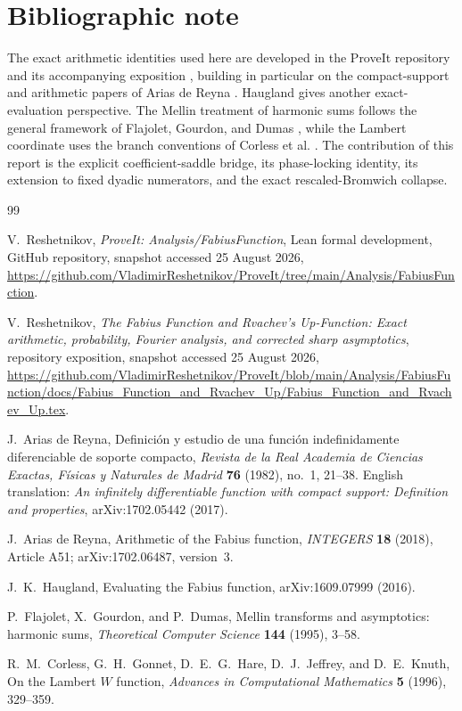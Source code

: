 \documentclass[11pt,oneside]{article}
\theoremstyle{definition}
\theoremstyle{remark}
\begin{document}
\section{Bibliographic note}

The exact arithmetic identities used here are developed in the ProveIt repository and its accompanying exposition \cite{proveit,masterdoc}, building in particular on the compact-support and arithmetic papers of Arias de Reyna \cite{arias1982,arias2018}.  Haugland \cite{haugland2016} gives another exact-evaluation perspective.  The Mellin treatment of harmonic sums follows the general framework of Flajolet, Gourdon, and Dumas \cite{flajolet1995}, while the Lambert coordinate uses the branch conventions of Corless et al. \cite{corless1996}.  The contribution of this report is the explicit coefficient-saddle bridge, its phase-locking identity, its extension to fixed dyadic numerators, and the exact rescaled-Bromwich collapse.

\begin{thebibliography}{99}

V.~Reshetnikov,
\newblock \emph{ProveIt: Analysis/FabiusFunction}, Lean formal development,
\newblock GitHub repository, snapshot accessed 25 August 2026,
\newblock \url{https://github.com/VladimirReshetnikov/ProveIt/tree/main/Analysis/FabiusFunction}.

V.~Reshetnikov,
\newblock \emph{The Fabius Function and Rvachev's Up-Function: Exact arithmetic, probability, Fourier analysis, and corrected sharp asymptotics},
\newblock repository exposition, snapshot accessed 25 August 2026,
\newblock \url{https://github.com/VladimirReshetnikov/ProveIt/blob/main/Analysis/FabiusFunction/docs/Fabius_Function_and_Rvachev_Up/Fabius_Function_and_Rvachev_Up.tex}.

J.~Arias de Reyna,
\newblock Definici\'on y estudio de una funci\'on indefinidamente diferenciable de soporte compacto,
\newblock \emph{Revista de la Real Academia de Ciencias Exactas, F\'isicas y Naturales de Madrid}
\textbf{76} (1982), no.~1, 21--38.
\newblock English translation: \emph{An infinitely differentiable function with compact support: Definition and properties}, arXiv:1702.05442 (2017).

J.~Arias de Reyna,
\newblock Arithmetic of the Fabius function,
\newblock \emph{INTEGERS} \textbf{18} (2018), Article A51; arXiv:1702.06487, version~3.

J.~K.~Haugland,
\newblock Evaluating the Fabius function,
\newblock arXiv:1609.07999 (2016).

P.~Flajolet, X.~Gourdon, and P.~Dumas,
\newblock Mellin transforms and asymptotics: harmonic sums,
\newblock \emph{Theoretical Computer Science} \textbf{144} (1995), 3--58.

R.~M.~Corless, G.~H.~Gonnet, D.~E.~G.~Hare, D.~J.~Jeffrey, and D.~E.~Knuth,
\newblock On the Lambert $W$ function,
\newblock \emph{Advances in Computational Mathematics} \textbf{5} (1996), 329--359.

\end{thebibliography}
\end{document}
